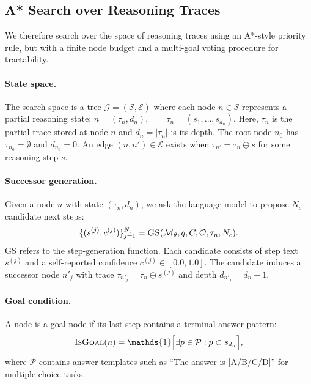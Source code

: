 \documentclass[11pt]{article}
\begin{document}
\subsection{A* Search over Reasoning Traces}
\label{sec:astar}

We therefore search over the space of reasoning traces using an A*-style priority rule, but with a finite node budget and a multi-goal voting procedure for tractability.

\paragraph{State space.}
The search space is a tree $\mathcal{G} = (\mathcal{S}, \mathcal{E})$ where each node $n \in \mathcal{S}$ represents a partial reasoning state: $n = (\tau_n, d_n), \qquad \tau_n = (s_1, \ldots, s_{d_n})$. Here, $\tau_n$ is the partial trace stored at node $n$ and $d_n = |\tau_n|$ is its depth. The root node $n_0$ has $\tau_{n_0} = \emptyset$ and $d_{n_0} = 0$. An edge $(n,n') \in \mathcal{E}$ exists when $\tau_{n'} = \tau_n \oplus s$ for some reasoning step $s$.

\paragraph{Successor generation.}
Given a node $n$ with state $(\tau_n, d_n)$, we ask the language model to propose $N_c$ candidate next steps:
\begin{equation}
\{(s^{(j)}, c^{(j)})\}_{j=1}^{N_c} = \textsc{GS}(\mathcal{M}_\theta, q, C, \mathcal{O}, \tau_n, N_c).
\label{eq:successor}
\end{equation}
\textsc{GS} refers to the step-generation function. Each candidate consists of step text $s^{(j)}$ and a self-reported confidence $c^{(j)} \in [0.0,1.0]$. The candidate induces a successor node $n'_j$ with trace $\tau_{n'_j} = \tau_n \oplus s^{(j)}$ and depth $d_{n'_j} = d_n + 1$.

\paragraph{Goal condition.}
A node is a goal node if its last step contains a terminal answer pattern:
\begin{equation}
\textsc{IsGoal}(n) = \mathds{1}\Big[\exists p \in \mathcal{P}: p \subset s_{d_n}\Big],
\label{eq:isgoal}
\end{equation}
where $\mathcal{P}$ contains answer templates such as ``The answer is [A/B/C/D]'' for multiple-choice tasks.
\end{document}
